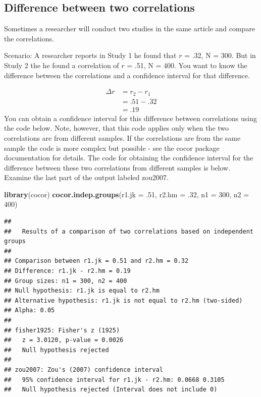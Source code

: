 \documentclass[
]{krantz}
\makeatletter
\newenvironment{Shaded}{\begin{snugshade}}{\end{snugshade}}
\newcommand{\DataTypeTok}[1]{\textcolor[rgb]{0.27,0.27,0.27}{#1}}
\newcommand{\DecValTok}[1]{\textcolor[rgb]{0.06,0.06,0.06}{#1}}
\newcommand{\FloatTok}[1]{\textcolor[rgb]{0.06,0.06,0.06}{#1}}
\newcommand{\KeywordTok}[1]{\textcolor[rgb]{0.27,0.27,0.27}{\textbf{#1}}}
\newcommand{\NormalTok}[1]{#1}
\newenvironment{kframe}{%
\medskip{}
\setlength{\fboxsep}{.8em}
 \def\at@end@of@kframe{}%
 \ifinner\ifhmode%
  \def\at@end@of@kframe{\end{minipage}}%
  \begin{minipage}{\columnwidth}%
 \fi\fi%
 \def\FrameCommand##1{\hskip\@totalleftmargin \hskip-\fboxsep
 \colorbox{shadecolor}{##1}\hskip-\fboxsep
     \hskip-\linewidth \hskip-\@totalleftmargin \hskip\columnwidth}%
 \MakeFramed {\advance\hsize-\width
   \@totalleftmargin\z@ \linewidth\hsize
   \@setminipage}}%
 {\par\unskip\endMakeFramed%
 \at@end@of@kframe}
\renewenvironment{Shaded}{\begin{kframe}}{\end{kframe}}
\makeatother
\begin{document}
\hypertarget{difference-between-two-correlations}{%
\subsection{Difference between two correlations}\label{difference-between-two-correlations}}

Sometimes a researcher will conduct two studies in the same article and compare the correlations.

Scenario: A researcher reports in Study 1 he found that \(r\) = .32, N = 300. But in Study 2 the he found a correlation of \(r\) = .51, N = 400. You want to know the difference between the correlations and a confidence interval for that difference.

\[
\begin{aligned}
\Delta r  &= r_2 - r_1 \\
&= .51 - .32 \\
&= .19
\end{aligned}
\]
You can obtain a confidence interval for this difference between correlations using the code below. Note, however, that this code applies only when the two correlations are from different samples. If the correlations are from the same sample the code is more complex but possible - see the cocor package documentation for details. The code for obtaining the confidence interval for the difference between these two correlations from different samples is below. Examine the last part of the output labeled zou2007.

\begin{Shaded}
\begin{Highlighting}[]
\KeywordTok{library}\NormalTok{(cocor)}
\KeywordTok{cocor.indep.groups}\NormalTok{(}\DataTypeTok{r1.jk =} \FloatTok{.51}\NormalTok{, }\DataTypeTok{r2.hm =} \FloatTok{.32}\NormalTok{, }\DataTypeTok{n1 =} \DecValTok{300}\NormalTok{, }\DataTypeTok{n2 =} \DecValTok{400}\NormalTok{)}
\end{Highlighting}
\end{Shaded}

\begin{verbatim}
## 
##   Results of a comparison of two correlations based on independent groups
## 
## Comparison between r1.jk = 0.51 and r2.hm = 0.32
## Difference: r1.jk - r2.hm = 0.19
## Group sizes: n1 = 300, n2 = 400
## Null hypothesis: r1.jk is equal to r2.hm
## Alternative hypothesis: r1.jk is not equal to r2.hm (two-sided)
## Alpha: 0.05
## 
## fisher1925: Fisher's z (1925)
##   z = 3.0120, p-value = 0.0026
##   Null hypothesis rejected
## 
## zou2007: Zou's (2007) confidence interval
##   95% confidence interval for r1.jk - r2.hm: 0.0668 0.3105
##   Null hypothesis rejected (Interval does not include 0)
\end{verbatim}
\end{document}
